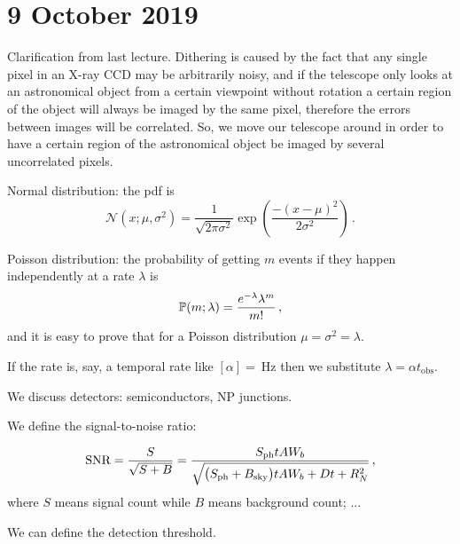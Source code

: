 \documentclass[main.tex]{subfiles}
\begin{document}
\section*{9 October 2019}

Clarification from last lecture.
Dithering is caused by the fact that any single pixel in an X-ray CCD may be arbitrarily noisy, and if the telescope only looks at an astronomical object from a certain viewpoint without rotation a certain region of the object will always be imaged by the same pixel, therefore the errors between images will be correlated.
So, we move our telescope around in order to have a certain region of the astronomical object be imaged by several uncorrelated pixels.

Normal distribution: the pdf is
%
\begin{equation}
  \mathcal N (x; \mu, \sigma^2) = \frac{1}{\sqrt{2 \pi \sigma^2}} \exp(\frac{-(x-\mu)^2}{2\sigma^2} ) \,.
\end{equation}

Poisson distribution: the probability of getting \(m\) events if they happen independently at a rate \(\lambda\) is
%
\begin{equation}
\P (m ; \lambda) = \frac{e^{-\lambda} \lambda^m}{m!} \,,
\end{equation}
%
and it is easy to prove that for a Poisson distribution \(\mu = \sigma^2 = \lambda\).

If the rate is, say, a temporal rate like \([\alpha] = \SI{}{\hertz}\) then we substitute \(\lambda = \alpha t_{\text{obs}}\).

We discuss detectors: semiconductors, NP junctions.

We define the signal-to-noise ratio:

\begin{equation}
	\text{SNR} = \frac{S}{\sqrt{S + B}}
	= \frac{S_{\text{ph}} t A W_b}{\sqrt{\qty(S_{\text{ph}} + B_\text{sky})tAW_b + Dt + R^2_N } }\,,
\end{equation}
%
where $S$ means signal count while $B$ means background count; ...

We can define the detection threshold.
\end{document}
